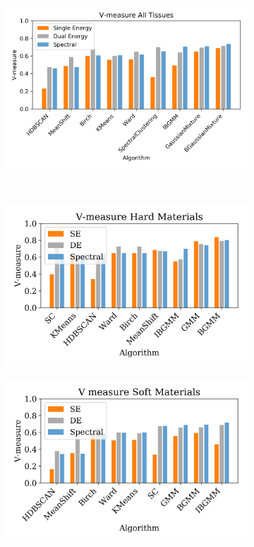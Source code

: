 \documentclass[a4paper,11pt]{article}
\begin{document}
\begin{figure}[b!]
    \centering
    \begin{subfigure}[b]{0.32\textwidth}
        \includegraphics[width=\textwidth]{figures/energy_comparison.png}
    \end{subfigure}
    ~ %
    \begin{subfigure}[b]{0.32\textwidth}
        \includegraphics[width=\textwidth]{figures/hard.png}
    \end{subfigure}
    \begin{subfigure}[b]{0.32\textwidth}
        \includegraphics[width=\textwidth]{figures/soft.png}

\end{subfigure}
\end{figure}
\end{document}
